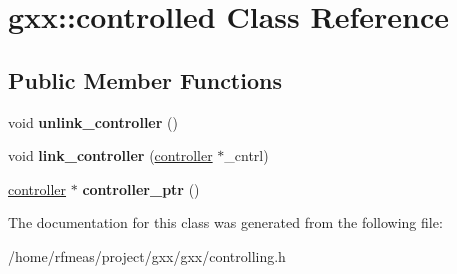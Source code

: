 \hypertarget{classgxx_1_1controlled}{}\section{gxx\+:\+:controlled Class Reference}
\label{classgxx_1_1controlled}
\subsection*{Public Member Functions}
\begin{DoxyCompactItemize}
\item 
void {\bfseries unlink\+\_\+controller} ()\hypertarget{classgxx_1_1controlled_a46a96a83461e8d5f48f93a462f8d86e4}{}\label{classgxx_1_1controlled_a46a96a83461e8d5f48f93a462f8d86e4}

\item 
void {\bfseries link\+\_\+controller} (\hyperlink{classgxx_1_1controller}{controller} $\ast$\+\_\+cntrl)\hypertarget{classgxx_1_1controlled_adb6c7f74eaef8754695c4f7df5dee916}{}\label{classgxx_1_1controlled_adb6c7f74eaef8754695c4f7df5dee916}

\item 
\hyperlink{classgxx_1_1controller}{controller} $\ast$ {\bfseries controller\+\_\+ptr} ()\hypertarget{classgxx_1_1controlled_a01e3b6f774453d1eabe431556b7ea825}{}\label{classgxx_1_1controlled_a01e3b6f774453d1eabe431556b7ea825}

\end{DoxyCompactItemize}


The documentation for this class was generated from the following file\+:\begin{DoxyCompactItemize}
\item 
/home/rfmeas/project/gxx/gxx/controlling.\+h\end{DoxyCompactItemize}
